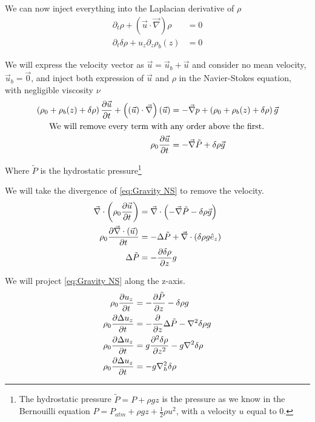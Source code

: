 We can now inject everything into the Laplacian derivative of $\rho$
\begin{align}
	\partial_t \rho + \left( \vec{u} \cdot \vec{\nabla} \right) \rho & = 0 \nonumber \\ 
	\partial_t \delta \rho + u_z \partial_z \rho_b(z) & = 0 \label{eq:Gravity Incompressibility}
\end{align}

We will express the velocity vector as $\vec{u} = \vec{u}_b +  \vec{u}$ and consider no mean velocity, $\vec{u}_b = \vec{0}$, and inject both expression of $\vec{u}$ and $\rho$ in the Navier-Stokes equation, with negligible viscosity $\nu$ 
\begin{align}
	\left( \rho_0 + \rho_b(z) + \delta \rho \right) \frac{\partial \vec{u}}{\partial t} + \left( \left( \vec{u} \right) \cdot \vec{\nabla} \right) \left( \vec{u} \right) & = - \vec{\nabla} p + \left( \rho_0 + \rho_b(z) + \delta \rho \right) \vec{g} \nonumber \\
	\text{We will remove every term with } & \text{any order above the first.} \nonumber \\
	\rho_0 \frac{\partial \vec{u}}{\partial t} & = - \vec{\nabla} \tilde{P} + \delta \rho \vec{g} \label{eq:Gravity NS}
\end{align}

Where $\tilde{P}$ is the hydrostatic pressure\footnote{The hydrostatic pressure $\tilde{P} = P + \rho g z$ is the pressure as we know in the Bernouilli equation $P = P_{atm} + \rho g z + \frac{1}{2} \rho u^2$, with a velocity $u$ equal to 0.}

We will take the divergence of \cref{eq:Gravity NS} to remove the velocity.
\begin{align*}
	\vec{\nabla} \cdot \left( \rho_0 \frac{\partial \vec{u}}{\partial t} \right) & = \vec{\nabla} \cdot \left( - \vec{\nabla} \tilde{P} - \delta \rho \vec{g} \right) \\
	 \rho_0 \frac{\partial \vec{\nabla} \cdot \left(\vec{u} \right)}{\partial t} & = - \Delta \tilde{P} + \vec{\nabla} \cdot \left( \delta \rho g \hat{e}_z \right) \\
	 \Delta \tilde{P} & = - \frac{\partial \delta \rho}{\partial z} g 
\end{align*}

We will project \cref{eq:Gravity NS} along the z-axis.
\begin{align*}
	\rho_0 \frac{\partial u_z}{\partial t} & = - \frac{\partial \tilde{P}}{\partial z} - \delta \rho g \\
	\rho_0  \frac{\partial \Delta u_z}{\partial t} & = - \frac{\partial }{\partial z} \Delta \tilde{P} - \nabla^2 \delta \rho g \\
	\rho_0  \frac{\partial \Delta u_z}{\partial t} & = g \frac{\partial^2 \delta \rho}{\partial z^2} - g \nabla^2 \delta \rho \\
	\rho_0  \frac{\partial \Delta u_z}{\partial t} & = - g \nabla_h^2 \delta \rho 
\end{align*}

